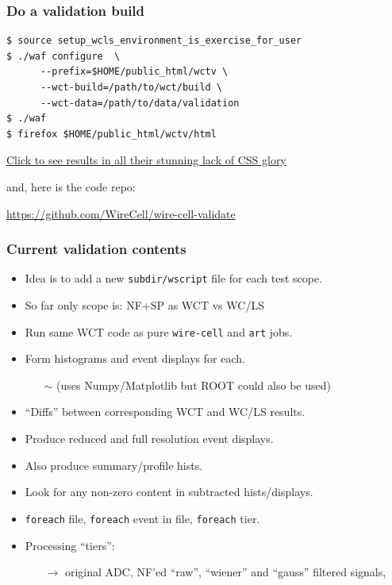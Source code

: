 \documentclass[xcolor=dvipsnames]{beamer}
\begin{document}
\begin{frame}[fragile]
  \frametitle{Do a validation build}

  \begin{verbatim}
$ source setup_wcls_environment_is_exercise_for_user
$ ./waf configure  \
      --prefix=$HOME/public_html/wctv \
      --wct-build=/path/to/wct/build \
      --wct-data=/path/to/data/validation
$ ./waf
$ firefox $HOME/public_html/wctv/html
\end{verbatim}

    \begin{center}\footnotesize
      \href{http://www.phy.bnl.gov/~bviren/tmp/wcls/validation/html/}{Click to see results in all their stunning lack of CSS glory}      

      \vfill

      and, here is the code repo:

      \url{https://github.com/WireCell/wire-cell-validate}    
    \end{center}
\end{frame}

\begin{frame}
  \frametitle{Current validation contents}
  \begin{itemize}\footnotesize
  \item Idea is to add a new \texttt{subdir/wscript} file for each test scope.
  \item So far only scope is: NF+SP as WCT vs WC/LS
  \item Run same WCT code as pure \texttt{wire-cell} and \texttt{art} jobs.
  \item Form histograms and event displays for each.
    \begin{itemize}\scriptsize
    \item[$\sim$] (uses Numpy/Matplotlib but ROOT could also be used)
    \end{itemize}
  \item ``Diffs'' between corresponding WCT and WC/LS results.
  \item Produce reduced and full resolution event displays.
  \item Also produce summary/profile hists.
  \item Look for any non-zero content in subtracted hists/displays.
  \item \texttt{foreach} file, \texttt{foreach} event in file, \texttt{foreach} tier.
  \item Processing ``tiers'':
    \begin{itemize}\scriptsize
    \item[$\to$] original ADC, NF'ed ``raw'', ``wiener'' and ``gauss'' filtered signals, 
    \end{itemize}
  \end{itemize}
\end{frame}
\end{document}

